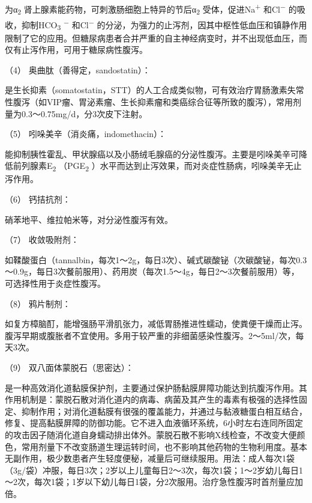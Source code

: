 为α\textsubscript{2}
肾上腺素能药物，可刺激肠细胞上特异的节后α\textsubscript{2}
受体，促进Na\textsuperscript{+} 和Cl\textsuperscript{−}
的吸收，抑制HCO\textsubscript{3} \textsuperscript{−}
和Cl\textsuperscript{−}
的分泌，为强力的止泻剂，因其中枢性低血压和镇静作用限制了它的应用。但糖尿病患者合并严重的自主神经病变时，并不出现低血压，而仅有止泻作用，可用于糖尿病性腹泻。

\hypertarget{text00030.htmlux5cux23CHP1-12-3-2-6-4}{}
（4） 奥曲肽（善得定，sandostatin）：

是生长抑素（somatostatin，STT）的人工合成类似物，可有效治疗胃肠激素失常性腹泻（如VIP瘤、胃泌素瘤、生长抑素瘤和类癌综合征等所致的腹泻），常用剂量为0.3～0.75mg/d，分3次皮下注射。

\hypertarget{text00030.htmlux5cux23CHP1-12-3-2-6-5}{}
（5） 吲哚美辛（消炎痛，indomethacin）：

能抑制胰性霍乱、甲状腺癌以及小肠绒毛腺癌的分泌性腹泻。主要是吲哚美辛可降低前列腺素E\textsubscript{2}
（PGE\textsubscript{2}
）水平而达到止泻效果，而对炎症性肠病，吲哚美辛无止泻作用。

\hypertarget{text00030.htmlux5cux23CHP1-12-3-2-6-6}{}
（6） 钙拮抗剂：

硝苯地平、维拉帕米等，对分泌性腹泻有效。

\hypertarget{text00030.htmlux5cux23CHP1-12-3-2-6-7}{}
（7） 收敛吸附剂：

如鞣酸蛋白（tannalbin，每次1～2g，每日3次）、碱式碳酸铋（次碳酸铋，每次0.3～0.9g，每日3次餐前服用）、药用炭（每次1.5～4g，每日2～3次餐前服用）等，可选择性用于炎症性腹泻。

\hypertarget{text00030.htmlux5cux23CHP1-12-3-2-6-8}{}
（8） 鸦片制剂：

如复方樟脑酊，能增强肠平滑肌张力，减低胃肠推进性蠕动，使粪便干燥而止泻。腹泻早期或腹胀者不宜使用。多用于较严重的非细菌感染性腹泻。2～5ml/次，每天3次。

\hypertarget{text00030.htmlux5cux23CHP1-12-3-2-6-9}{}
（9） 双八面体蒙脱石（思密达）：

是一种高效消化道黏膜保护剂，主要通过保护肠黏膜屏障功能达到抗腹泻作用。其作用机制是：蒙脱石散对消化道内的病毒、病菌及其产生的毒素有极强的选择性固定、抑制作用；对消化道黏膜有很强的覆盖能力，并通过与黏液糖蛋白相互结合，修复、提高黏膜屏障的防御功能。它不进入血液循环系统，6小时左右连同所固定的攻击因子随消化道自身蠕动排出体外。蒙脱石散不影响X线检查，不改变大便颜色，常用剂量下不改变肠道生理运转时间，也不影响其他药物的生物利用度。基本无副作用，极少数患者产生轻度便秘，减量后可继续服用。用法：成人每次1袋（3g/袋）冲服，每日3次；2岁以上儿童每日2～3次，每次1袋；1～2岁幼儿每日1～2次，每次1袋；1岁以下幼儿每日1袋，分2次服用。治疗急性腹泻时首剂量应加倍。

